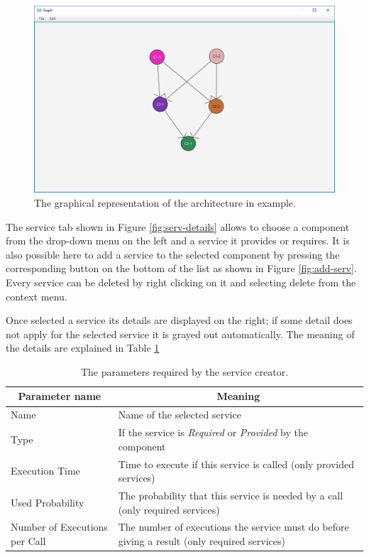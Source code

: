 \begin{figure}[!ht]
	\centerline
	{\includegraphics[scale=0.50]{img/view_arch.png}}
	\caption[Architecture Graphical Representation]{The graphical representation of the architecture in example.}
	\label{fig:view-arch}
\end{figure}

The service tab shown in Figure \ref{fig:serv-details} allows to choose a component from the drop-down menu on the left and a service it provides or requires. It is also possible here to add a service to the selected component by pressing the corresponding button on the bottom of the list as shown in Figure \ref{fig:add-serv}. Every service can be deleted by right clicking on it and selecting delete from the context menu.

Once selected a service its details are displayed on the right; if some detail does not apply for the selected service it is grayed out automatically. The meaning of the details are explained in Table \ref{tab:serv-details}

\begin{table}[ht!b]
	\centering
	\begin{tabular}{|p{}|p{9cm}|}
		\hline
		\multicolumn{1}{|c|}{Parameter name} & \multicolumn{1}{c|}{Meaning} \\
		\hline 
		Name & Name of the selected service \\
		\hline
		Type & If the service is \emph{Required} or \emph{Provided} by the component \\
		\hline
		Execution Time & Time to execute if this service is called (only provided services)\\
		\hline
		Used Probability & The probability that this service is needed by a call (only required services)\\
		\hline
		Number of Executions per Call & The number of executions the service must do before giving a result (only required services) \\
		\hline
		
	\end{tabular} 
	\caption[Service Parameters]{The parameters required by the service creator.}
	\label{tab:serv-details}
\end{table}


